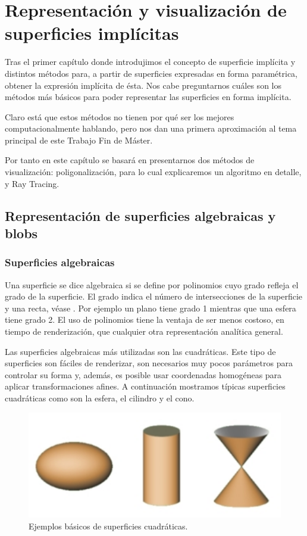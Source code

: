 \chapter{Representación y visualización de superficies implícitas}

Tras el primer capítulo donde introdujimos el concepto de superficie implícita y distintos métodos para, a partir de superficies expresadas en forma paramétrica, obtener la expresión implícita de ésta. Nos cabe preguntarnos cuáles son los métodos más básicos para poder representar las superficies en forma implícita.

Claro está que estos métodos no tienen por qué ser los mejores computacionalmente hablando, pero nos dan una primera aproximación al tema principal de este Trabajo Fin de Máster.

Por tanto en este capítulo se basará en presentarnos dos métodos de visualización: poligonalización, para lo cual explicaremos un algoritmo en detalle, y Ray Tracing.

\section{Representación de superficies algebraicas y blobs}

\subsection{Superficies algebraicas}

Una superficie se dice algebraica si se define por polinomios cuyo grado refleja el grado de la superficie. El grado indica el número de intersecciones de la superficie y una recta, véase \cite{Bloomenthal97}. Por ejemplo un plano tiene grado 1 mientras que una esfera tiene grado 2. El uso de polinomios tiene la ventaja de ser menos costoso, en tiempo de renderización, que cualquier otra representación analítica general.

Las superficies algebraicas más utilizadas son las cuadráticas. Este tipo de superficies son fáciles de renderizar, son necesarios muy pocos parámetros para controlar su forma y, además, es posible usar coordenadas homogéneas para aplicar transformaciones afines. A continuación mostramos típicas superficies cuadráticas como son la esfera, el cilindro y el cono.
\begin{figure}[h]
	\centering
	\includegraphics[scale=0.7]{images/florez4.png}
	\caption{Ejemplos básicos de superficies cuadráticas.}
\end{figure}

